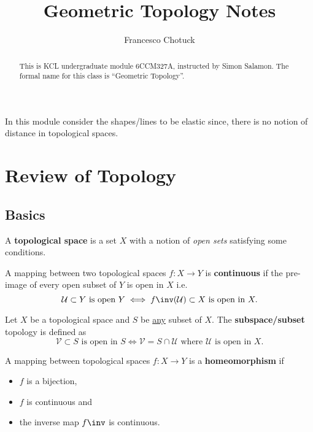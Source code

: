 \documentclass[12pt, a4paper]{article}
\title{Geometric Topology Notes}
\date{}
\author{Francesco Chotuck}
\begin{document}
\maketitle

\begin{abstract}
    This is KCL undergraduate module 6CCM327A, instructed by Simon Salamon. The formal name for this class is ``Geometric Topology''.
\end{abstract}

\tableofcontents

\pagebreak

\begin{mdremark}
    In this module consider the shapes/lines to be elastic since, there is no notion of distance in topological spaces.
\end{mdremark}

\section{Review of Topology}

\subsection{Basics}

\begin{definition}
    A \textbf{topological space} is a set \(X\) with a notion of \textit{open sets} satisfying some conditions.
\end{definition}

\begin{definition}
    A mapping between two topological spaces \(f:X \to Y\) is \textbf{continuous} if the pre-image of every open subset of \(Y\) is open in \(X\) i.e. 
    \[\mathcal{U} \subset Y \text{ is open } Y \iff f\inv(\mathcal{U})\subset X \text{ is open in } X.\]
\end{definition}

\begin{definition}
    Let \(X\) be a topological space and \(S\) be \underline{any} subset of \(X\). The \textbf{subspace/subset} topology is defined as 
    \[\mathcal{V} \subset S \text{ is open in } S \iff \mathcal{V}= S \cap \mathcal{U} \text{ where \(\mathcal{U}\) is open in } X.\]
\end{definition}

\begin{definition}
    A mapping between topological spaces \(f:X \to Y\) is a \textbf{homeomorphism} if
    \begin{itemize}
        \item \(f\) is a bijection,
        \item \(f\) is continuous and
        \item the inverse map \(f\inv\) is continuous.
    \end{itemize}
\end{definition}
\end{document}
